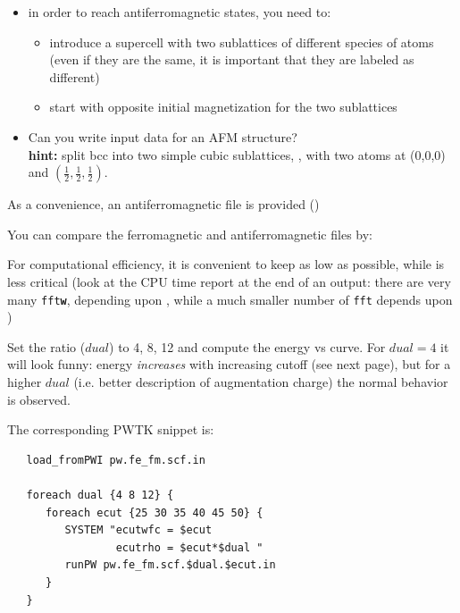 \documentclass[landscape]{foils}
\begin{document}
\begin{itemize}
  \item in order to reach antiferromagnetic states, you need to:
  \begin{itemize}
  \item introduce a {\burgundy supercell} with two sublattices of 
    different species of atoms (even if they are the same,
    it is important that they are labeled as different)
  \item start with opposite initial magnetization for the two 
    sublattices
  \end{itemize} 

\item Can you write input data for an AFM structure?\\
  {\gray\small {\bf hint:} split bcc into two simple cubic sublattices,
    , with two atoms at (0,0,0) and
    $(\frac{1}{2},\frac{1}{2},\frac{1}{2})$}.
\end{itemize}

\vfill

As a convenience, an antiferromagnetic file is provided
()

You can compare the ferromagnetic and antiferromagnetic files
by:\\[1em]



%
For computational efficiency, it is convenient to keep 
as low as possible, while  is less critical
{\gray\small (look at 
the CPU time report at the end of an output: there are very many
\texttt{fft{\bf w}}, depending upon , while a much smaller
number of \texttt{fft} depends upon )}

Set the  ratio ($dual$) to 4, 8, 12 and compute
the energy vs  curve. For $dual=4$ it will look funny:
energy {\em increases} with increasing cutoff (see next page), but for
a higher $dual$ (i.e.\@{} better description of augmentation charge) the
normal behavior is observed.

The corresponding PWTK snippet is:
{\codecolor\small
\begin{verbatim}
   load_fromPWI pw.fe_fm.scf.in

   foreach dual {4 8 12} {
      foreach ecut {25 30 35 40 45 50} {
         SYSTEM "ecutwfc = $ecut
                 ecutrho = $ecut*$dual "
         runPW pw.fe_fm.scf.$dual.$ecut.in
      }
   }
\end{verbatim}
}
\end{document}
